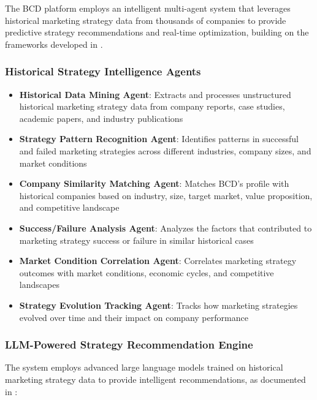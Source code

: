 The BCD platform employs an intelligent multi-agent system that leverages historical marketing strategy data from thousands of companies to provide predictive strategy recommendations and real-time optimization, building on the frameworks developed in \citep{reiff_multiagent_sophisticated_system}.

\subsubsection{Historical Strategy Intelligence Agents}

\begin{itemize}
    \item \textbf{Historical Data Mining Agent}: Extracts and processes unstructured historical marketing strategy data from company reports, case studies, academic papers, and industry publications
    \item \textbf{Strategy Pattern Recognition Agent}: Identifies patterns in successful and failed marketing strategies across different industries, company sizes, and market conditions
    \item \textbf{Company Similarity Matching Agent}: Matches BCD's profile with historical companies based on industry, size, target market, value proposition, and competitive landscape
    \item \textbf{Success/Failure Analysis Agent}: Analyzes the factors that contributed to marketing strategy success or failure in similar historical cases
    \item \textbf{Market Condition Correlation Agent}: Correlates marketing strategy outcomes with market conditions, economic cycles, and competitive landscapes
    \item \textbf{Strategy Evolution Tracking Agent}: Tracks how marketing strategies evolved over time and their impact on company performance
\end{itemize}

\subsubsection{LLM-Powered Strategy Recommendation Engine}

The system employs advanced large language models trained on historical marketing strategy data to provide intelligent recommendations, as documented in \citep{ferede_artificial_intelligence_ai}:

